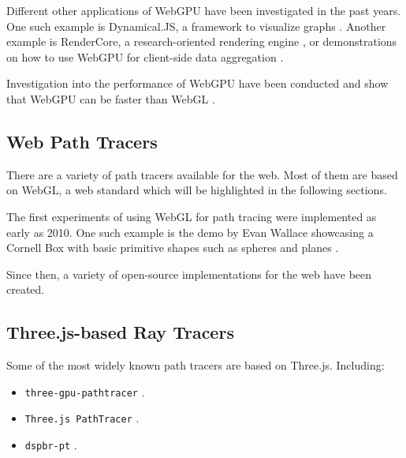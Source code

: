 Different other applications of WebGPU have been investigated in the past years. One such example is Dynamical.JS, a framework to visualize graphs \cite{dotson2022dynamicaljs}. Another example is RenderCore, a research-oriented rendering engine \cite{Bohak_Kovalskyi_Linev_Mrak_Tadel_Strban_Tadel_Yagil_2024}, or demonstrations on how to use WebGPU for client-side data aggregation \cite{kimmersdorfer2023webgpu}.

Investigation into the performance of WebGPU have been conducted and show that WebGPU can be faster than WebGL \cite{webGPUWebGis, fransson2023performance, CHICKERUR2024919}.
 

\subsection*{Web Path Tracers}

There are a variety of path tracers available for the web. Most of them are based on WebGL, a web standard which will be highlighted in the following sections.

The first experiments of using WebGL for path tracing were implemented as early as 2010. One such example is the demo by Evan Wallace showcasing a Cornell Box with basic primitive shapes such as spheres and planes \cite{pathTracerWallace}.

Since then, a variety of open-source implementations for the web have been created.

\subsection*{Three.js-based Ray Tracers}

Some of the most widely known path tracers are based on Three.js. Including:

\begin{itemize}
    \item {\texttt{three-gpu-pathtracer}} \cite{ThreeJsPathTracerJohnson}.
    \item{\texttt{Three.js PathTracer}} \cite{ThreeJsPathTracerLoftis}.
    \item {\texttt{dspbr-pt}} \cite{PathTracerDassault}.
  \end{itemize}
